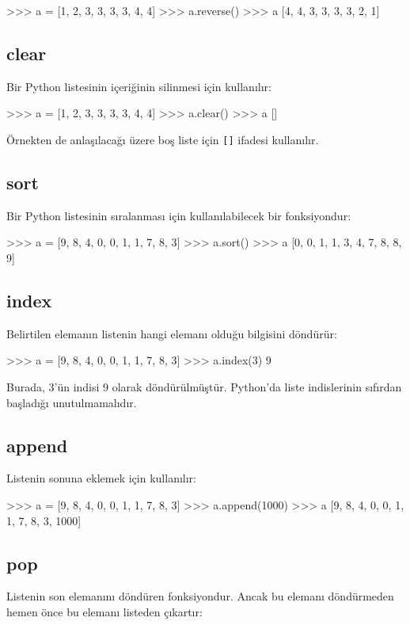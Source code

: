 \documentclass[12pt]{report}
\begin{document}
\begin{python}
>>> a = [1, 2, 3, 3, 3, 3, 4, 4]
>>> a.reverse()
>>> a
[4, 4, 3, 3, 3, 3, 2, 1]
\end{python} 


\subsection{clear}
Bir Python listesinin içeriğinin silinmesi için kullanılır:

\begin{python}
>>> a = [1, 2, 3, 3, 3, 3, 4, 4]
>>> a.clear()
>>> a
[]	
\end{python}	

Örnekten de anlaşılacağı üzere boş liste için \texttt{[]} ifadesi kullanılır.

\subsection{sort}
Bir Python listesinin sıralanması için kullanılabilecek bir fonksiyondur:

\begin{python}
>>> a = [9, 8, 4, 0, 0, 1, 1, 7, 8, 3]
>>> a.sort()
>>> a
[0, 0, 1, 1, 3, 4, 7, 8, 8, 9]
\end{python}


\subsection{index}
Belirtilen elemanın listenin hangi elemanı olduğu bilgisini döndürür:

\begin{python}
>>> a = [9, 8, 4, 0, 0, 1, 1, 7, 8, 3]
>>> a.index(3)
9
\end{python}

Burada, 3'ün indisi 9 olarak döndürülmüştür. Python'da liste indislerinin sıfırdan başladığı unutulmamalıdır. 

\subsection{append}
Listenin sonuna eklemek için kullanılır:

\begin{python}
>>> a = [9, 8, 4, 0, 0, 1, 1, 7, 8, 3]
>>> a.append(1000)
>>> a
[9, 8, 4, 0, 0, 1, 1, 7, 8, 3, 1000]
\end{python}

\subsection{pop}
Listenin son elemanını döndüren fonksiyondur. Ancak bu elemanı döndürmeden hemen önce bu elemanı listeden çıkartır:
\end{document}
